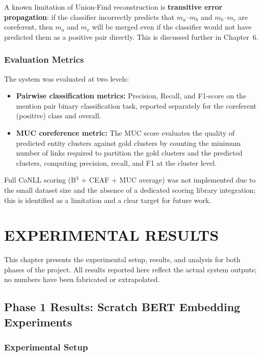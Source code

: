 \documentclass[12pt,a4paper]{report}
\begin{document}
\noindent A known limitation of Union-Find reconstruction is \textbf{transitive error propagation}: if the classifier incorrectly predicts that $m_a$--$m_b$ and $m_b$--$m_c$ are coreferent, then $m_a$ and $m_c$ will be merged even if the classifier would not have predicted them as a positive pair directly. This is discussed further in Chapter~6.

\subsection{Evaluation Metrics}

The system was evaluated at two levels:

\begin{itemize}
    \item \textbf{Pairwise classification metrics:} Precision, Recall, and F1-score on the mention pair binary classification task, reported separately for the coreferent (positive) class and overall.
    \item \textbf{MUC coreference metric:} The MUC score \cite{vilain1995model} evaluates the quality of predicted entity clusters against gold clusters by counting the minimum number of links required to partition the gold clusters and the predicted clusters, computing precision, recall, and F1 at the cluster level.
\end{itemize}

Full CoNLL scoring (B$^3$ + CEAF + MUC average) was not implemented due to the small dataset size and the absence of a dedicated scoring library integration; this is identified as a limitation and a clear target for future work.


\chapter{EXPERIMENTAL RESULTS}

This chapter presents the experimental setup, results, and analysis for both phases of the project. All results reported here reflect the actual system outputs; no numbers have been fabricated or extrapolated.

\section{Phase 1 Results: Scratch BERT Embedding Experiments}

\subsection{Experimental Setup}
\end{document}
